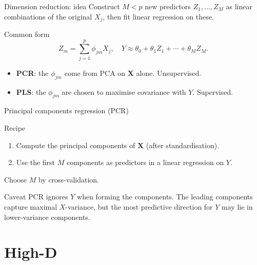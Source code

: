 \documentclass[aspectratio=169,11pt]{beamer}
\begin{document}
\begin{frame}{Dimension reduction: idea}
  Construct $M < p$ new predictors $Z_1, \ldots, Z_M$ as linear
  combinations of the original $X_j$, then fit linear regression on
  these.
  \begin{block}{Common form}
    \[
      Z_m = \sum_{j=1}^p \phi_{jm} X_j, \quad
      Y \approx \theta_0 + \theta_1 Z_1 + \cdots + \theta_M Z_M.
    \]
  \end{block}
  \begin{takeaway}
    \begin{itemize}
      \item \textbf{PCR}: the $\phi_{jm}$ come from PCA on $\mathbf{X}$
            alone. Unsupervised.
      \item \textbf{PLS}: the $\phi_{jm}$ are chosen to maximise
            covariance with $Y$. Supervised.
    \end{itemize}
  \end{takeaway}
\end{frame}

\begin{frame}{Principal components regression (PCR)}
  \begin{block}{Recipe}
    \begin{enumerate}
      \item Compute the principal components of $\mathbf{X}$ (after
            standardisation).
      \item Use the first $M$ components as predictors in a linear
            regression on $Y$.
    \end{enumerate}
  \end{block}
  Choose $M$ by cross-validation.
  \begin{alertblock}{Caveat}
    PCR ignores $Y$ when forming the components. The leading
    components capture maximal $X$-variance, but the most predictive
    direction for $Y$ may lie in lower-variance components.
  \end{alertblock}
\end{frame}





\section{High-D}
\end{document}
